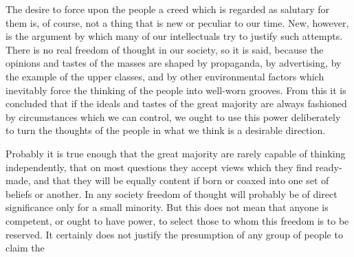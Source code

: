 \documentclass[11pt,openany]{book}
\begin{document}
\begin{center}\textasteriskcentered\hspace{0.9em}\textasteriskcentered\hspace{0.9em}\textasteriskcentered\end{center}

\begin{center}\textasteriskcentered\hspace{0.9em}\textasteriskcentered\hspace{0.9em}\textasteriskcentered\end{center}

\begin{center}\textasteriskcentered\hspace{0.9em}\textasteriskcentered\hspace{0.9em}\textasteriskcentered\end{center}

\begin{center}\textasteriskcentered\hspace{0.9em}\textasteriskcentered\hspace{0.9em}\textasteriskcentered\end{center}

\begin{center}\textasteriskcentered\hspace{0.9em}\textasteriskcentered\hspace{0.9em}\textasteriskcentered\end{center}

The desire to force upon the people a creed which is regarded as salutary for them is, of course, not a thing that is new or peculiar to our time. New, however, is the argument by which many of our intellectuals try to justify such attempts. There is no real freedom of thought in our society, so it is said, because the opinions and tastes of the masses are shaped by propaganda, by advertising, by the example of the upper classes, and by other environmental factors which inevitably force the thinking of the people into well-worn grooves. From this it is concluded that if the ideals and tastes of the great majority are always fashioned by circumstances which we can control, we ought to use this power deliberately to turn the thoughts of the people in what we think is a desirable direction.

Probably it is true enough that the great majority are rarely capable of thinking independently, that on most questions they accept views which they find ready-made, and that they will be equally content if born or coaxed into one set of beliefs or another. In any society freedom of thought will probably be of direct significance only for a small minority. But this does not mean that anyone is competent, or ought to have power, to select those to whom this freedom is to be reserved. It certainly does not justify the presumption of any group of people to claim the
\end{document}
